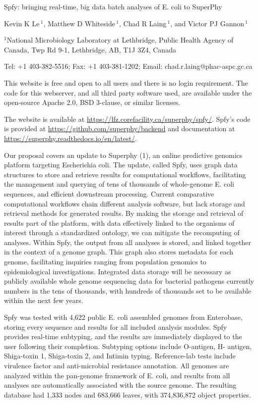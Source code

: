 \documentclass{article}
\begin{document}
Spfy: bringing real-time, big data batch analyses of E. coli to SuperPhy

Kevin K Le\,$^{1}$,
Matthew D Whiteside\,$^{1}$,
Chad R Laing\,$^{1}$,
and Victor PJ Gannon\,$^{1}$

$^{1}$National Microbiology Laboratory at Lethbridge, Public Health Agency of Canada, Twp Rd 9-1, Lethbridge, AB, T1J 3Z4, Canada

Tel: +1 403-382-5516; Fax: +1 403-381-1202; Email: chad.r.laing@phac-aspc.gc.ca

This website is free and open to all users and there is no login requirement. The code for this webserver, and all third party software used, are available under the open-source Apache 2.0, BSD 3-clause, or similar licenses.

The website is available at \url{https://lfz.corefacility.ca/superphy/spfy/}. Spfy’s code is provided at \url{https://github.com/superphy/backend} and documentation at \url{https://superphy.readthedocs.io/en/latest/}.

Our proposal covers an update to Superphy (1), an online predictive genomics platform targeting Escherichia coli. The update, called Spfy, uses graph data structures to store and retrieve results for computational workflows, facilitating the management and querying of tens of thousands of whole-genome E. coli sequences, and efficient downstream processing. Current comparative computational workflows chain different analysis software, but lack storage and retrieval methods for generated results. By making the storage and retrieval of results part of the platform, with data effectively linked to the organisms of interest through a standardized ontology, we can mitigate the recomputing of analyses. Within Spfy, the output from all analyses is stored, and linked together in the context of a genome graph. This graph also stores metadata for each genome, facilitating inquiries ranging from population genomics to epidemiological investigations. Integrated data storage will be necessary as publicly available whole genome sequencing data for bacterial pathogens currently numbers in the tens of thousands, with hundreds of thousands set to be available within the next few years.

Spfy was tested with 4,622 public E. coli assembled genomes from Enterobase, storing every sequence and results for all included analysis modules. Spfy provides real-time subtyping, and the results are immediately displayed to the user following their completion. Subtyping options include O-antigen, H- antigen, Shiga-toxin 1, Shiga-toxin 2, and Intimin typing. Reference-lab tests include virulence factor and anti-microbial resistance annotation. All genomes are analyzed within the pan-genome framework of E. coli, and results from all analyses are automatically associated with the source genome. The resulting database had 1,333 nodes and 683,666 leaves, with 374,836,872 object properties.
\end{document}
